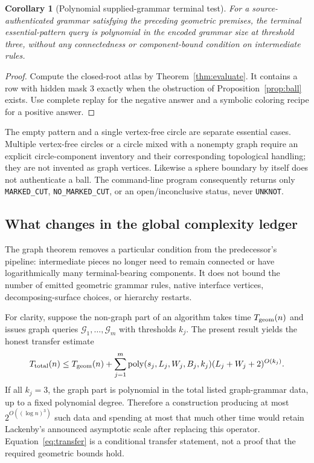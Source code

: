 \documentclass[11pt,letterpaper]{article}
\newtheorem{corollary}[theorem]{Corollary}
\theoremstyle{definition}
\theoremstyle{remark}\newtheorem{remark}[theorem]{Remark}
\newcommand{\poly}{\operatorname{poly}}
\DeclareRobustCommand{\code}[1]{\nolinkurl{#1}}
\begin{document}
\begin{corollary}[Polynomial supplied-grammar terminal test]\label{cor:terminal}
For a source-authenticated grammar satisfying the preceding geometric premises, the terminal essential-pattern query is polynomial in the encoded grammar size at threshold three, without any connectedness or component-bound condition on intermediate rules.
\end{corollary}
\begin{proof}
Compute the closed-root atlas by Theorem~\ref{thm:evaluate}. It contains a row with hidden mask 3 exactly when the obstruction of Proposition~\ref{prop:ball} exists. Use complete replay for the negative answer and a symbolic coloring recipe for a positive answer.
\end{proof}
The empty pattern and a single vertex-free circle are separate essential cases. Multiple vertex-free circles or a circle mixed with a nonempty graph require an explicit circle-component inventory and their corresponding topological handling; they are not invented as graph vertices. Likewise a sphere boundary by itself does not authenticate a ball. The command-line program consequently returns only \code{MARKED_CUT}, \code{NO_MARKED_CUT}, or an open/inconclusive status, never \code{UNKNOT}.

\subsection{What changes in the global complexity ledger}
The graph theorem removes a particular condition from the predecessor's pipeline: intermediate pieces no longer need to remain connected or have logarithmically many terminal-bearing components. It does not bound the number of emitted geometric grammar rules, native interface vertices, decomposing-surface choices, or hierarchy restarts.

For clarity, suppose the non-graph part of an algorithm takes time $T_{\rm geom}(n)$ and issues graph queries $\mathcal G_1,\ldots,\mathcal G_m$ with thresholds $k_j$. The present result yields the honest transfer estimate
\begin{equation}\label{eq:transfer}
 T_{\rm total}(n)\le T_{\rm geom}(n)+
 \sum_{j=1}^{m}\poly(s_j,L_j,W_j,B_j,k_j)
       (L_j+W_j+2)^{O(k_j)}.
\end{equation}
If all $k_j=3$, the graph part is polynomial in the total listed graph-grammar data, up to a fixed polynomial degree. Therefore a construction producing at most $2^{O((\log n)^3)}$ such data and spending at most that much other time would retain Lackenby's announced asymptotic scale after replacing this operator. Equation~\eqref{eq:transfer} is a conditional transfer statement, not a proof that the required geometric bounds hold.
\end{document}
